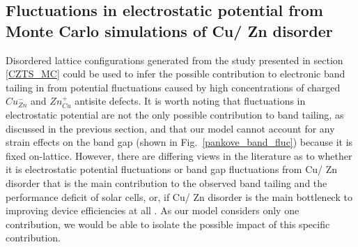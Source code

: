 \documentclass[11pt, twoside]{report}
\begin{document}





\subsection{Fluctuations in electrostatic potential from Monte Carlo simulations of Cu/ Zn disorder}

Disordered lattice configurations generated from the study presented in section \ref{CZTS_MC} \cite{eris_paper} could be used to infer the possible contribution to electronic band tailing in {\CZTS} from potential fluctuations caused by high concentrations of charged $Cu_{Zn}^{-}$ and $Zn_{Cu}^{+}$ antisite defects. 
It is worth noting that fluctuations in electrostatic potential are not the only possible contribution to band tailing, as discussed in the previous section, and that our model cannot account for any strain effects on the band gap (shown in Fig.~\ref{pankove_band_fluc}) because it is fixed on-lattice. However, there are differing views in the literature as to whether it is electrostatic potential fluctuations or band gap fluctuations from Cu/ Zn disorder that is the main contribution to the observed band tailing and the performance deficit of {\CZTS} solar cells, or, if Cu/ Zn disorder is the main bottleneck to improving device efficiencies at all \cite{culprit, kesterite_band_tails, band_tail}. As our model considers only one contribution, we would be able to isolate the possible impact of this specific contribution.
\end{document}

